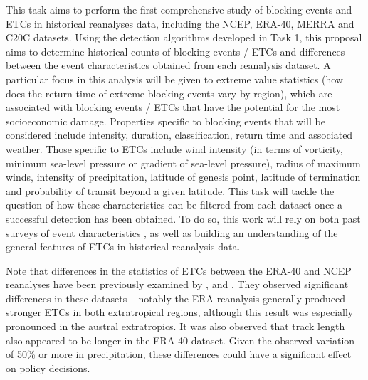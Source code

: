 \documentclass[11pt]{article}
\begin{document}
This task aims to perform the first comprehensive study of blocking events and ETCs in historical reanalyses data, including the NCEP, ERA-40, MERRA and C20C datasets.  Using the detection algorithms developed in Task 1, this proposal aims to determine historical counts of blocking events / ETCs and differences between the event characteristics obtained from each reanalysis dataset.  A particular focus in this analysis will be given to extreme value statistics (how does the return time of extreme blocking events vary by region), which are associated with blocking events / ETCs that have the potential for the most socioeconomic damage.  Properties specific to blocking events that will be considered include intensity, duration, classification, return time and associated weather.  Those specific to ETCs include wind intensity (in terms of vorticity, minimum sea-level pressure or gradient of sea-level pressure), radius of maximum winds, intensity of precipitation, latitude of genesis point, latitude of termination and probability of transit beyond a given latitude.  This task will tackle the question of how these characteristics can be filtered from each dataset once a successful detection has been obtained.  To do so, this work will rely on both past surveys of event characteristics \citep{serreze1995climatological}, as well as building an understanding of the general features of ETCs in historical reanalysis data.

Note that differences in the statistics of ETCs between the ERA-40 and NCEP reanalyses have been previously examined by \cite{hodges2003comparison}, \cite{wang2006climatology} and \cite{raible2008northern}. They observed significant differences in these datasets -- notably the ERA reanalysis generally produced stronger ETCs in both extratropical regions, although this result was especially pronounced in the austral extratropics. It was also observed that track length also appeared to be longer in the ERA-40 dataset.  Given the observed variation of 50\% or more in precipitation, these differences could have a significant effect on policy decisions.
\end{document}
